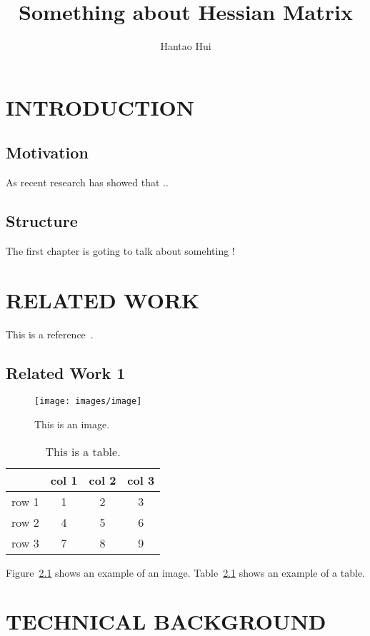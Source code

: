\documentclass[
	11pt, 
	a4paper, 
	oneside,  
	final, 
]{report}
\title{Something about Hessian Matrix}
\author{Hantao Hui}
\begin{document}
\maketitle
\newpage
\tableofcontents

\chapter{INTRODUCTION}
\section{Motivation}
As recent research has showed that ..
\section{Structure}
The first chapter is goting to talk about somehting !
\chapter{RELATED WORK}

This is a reference~\cite{Foley:1990}.

\section{Related Work 1}

\begin{figure}[tb]
	\centering
	\texttt{[image: images/image]}
	\caption{\label{fig:image} This is an image.
	}
\end{figure}

\begin{table}[tb]
	{
		\centering
		\begin{tabular}{|c|c|c|c|}
			\hline
			      & col 1 & col 2 & col 3 \\
			\hline	
			row 1 & 1     & 2     & 3     \\
			row 2 & 4     & 5     & 6     \\
			row 3 & 7     & 8     & 9     \\
			\hline
		\end{tabular}
		\caption{\label{tab:example} This is a table.}
	}
\end{table}


Figure~\ref{fig:image} shows an example of an image.
Table~\ref{tab:example} shows an example of a table.


\chapter{TECHNICAL BACKGROUND}
\end{document}
